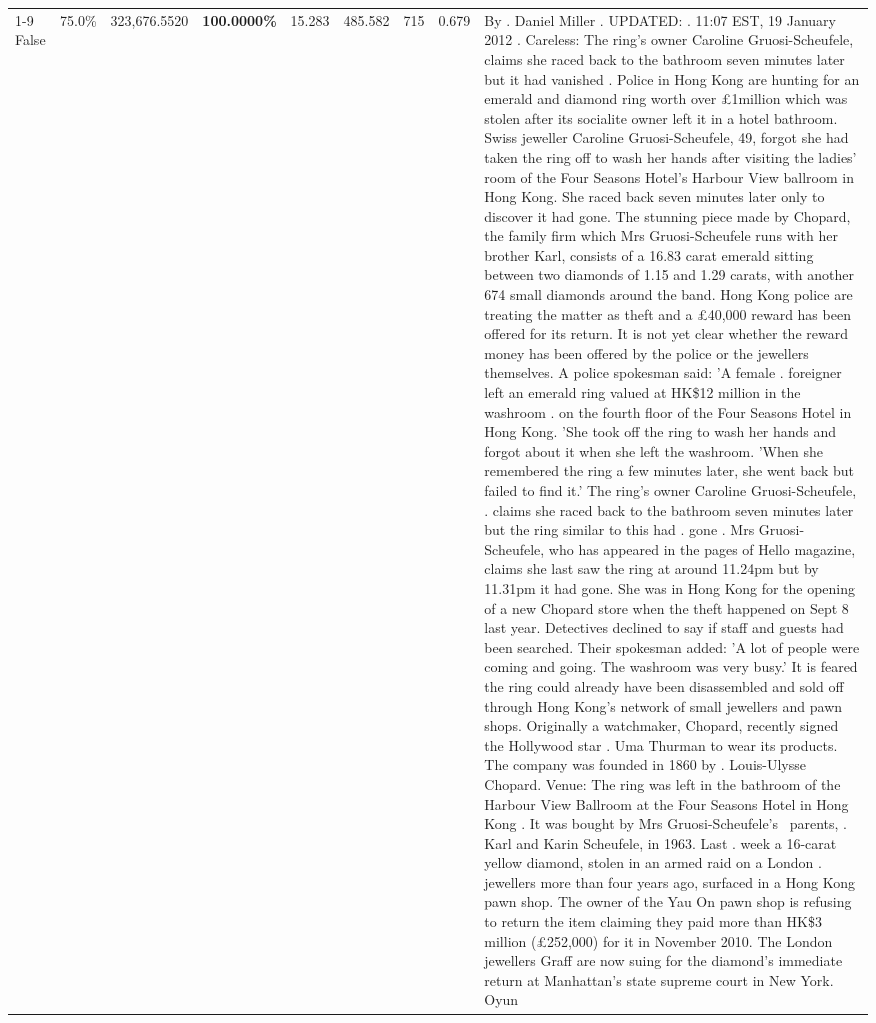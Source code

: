 \begin{table}[H]
\begin{tabular}{lllrlllll}
\cline{1-9}
False & 75.0\% & 323,676.5520 & \bfseries \color{red} 100.0000\% & 15.283 & 485.582 & 715 & 0.679 & By . Daniel Miller . UPDATED: . 11:07 EST, 19 January 2012 . Careless: The ring's owner Caroline Gruosi-Scheufele, claims she raced back to the bathroom seven minutes later but it had vanished . Police in Hong Kong are hunting for an emerald and diamond ring worth over £1million which was stolen after its socialite owner left it in a hotel bathroom. Swiss jeweller Caroline Gruosi-Scheufele, 49, forgot she had taken the ring off to wash her hands after visiting the ladies' room of the Four Seasons Hotel's Harbour View ballroom in Hong Kong. She raced back seven minutes later only to discover it had gone. The stunning piece made by Chopard, the family firm which Mrs Gruosi-Scheufele runs with her brother Karl, consists of a 16.83 carat emerald sitting between two diamonds of 1.15 and 1.29 carats, with another 674 small diamonds around the band. Hong Kong police are treating the matter as theft and a £40,000 reward has been offered for its return. It is not yet clear whether the reward money has been offered by the police or the jewellers themselves. A police spokesman said: 'A female . foreigner left an emerald ring valued at HK\$12 million in the washroom . on the fourth floor of the Four Seasons Hotel in Hong Kong. 'She took off the ring to wash her hands and forgot about it when she left the washroom. 'When she remembered the ring a few minutes later, she went back but failed to find it.' The ring's owner Caroline Gruosi-Scheufele, . claims she raced back to the bathroom seven minutes later but the ring similar to this had . gone . Mrs Gruosi-Scheufele, who has appeared in the pages of Hello magazine, claims she last saw the ring at around 11.24pm but by 11.31pm it had gone. She was in Hong Kong for the opening of a new Chopard store when the theft happened on Sept 8 last year. Detectives declined to say if staff and guests had been searched. Their spokesman added: 'A lot of people were coming and going. The washroom was very busy.' It is feared the ring could already have been disassembled and sold off through Hong Kong's network of small jewellers and pawn shops. Originally a watchmaker, Chopard, recently signed the Hollywood star . Uma Thurman to wear its products. The company was founded in 1860 by . Louis-Ulysse Chopard. Venue: The ring was left in the bathroom of the Harbour View Ballroom at the Four Seasons Hotel in Hong Kong . It was bought by Mrs Gruosi-Scheufele's  parents, . Karl and Karin Scheufele, in 1963. Last . week a 16-carat yellow diamond, stolen in an armed raid on a London . jewellers more than four years ago, surfaced in a Hong Kong pawn shop. The owner of the Yau On pawn shop is refusing to return the item claiming they paid more than HK\$3 million (£252,000) for it in November 2010. The London jewellers Graff are now suing for the diamond’s immediate return at Manhattan’s state supreme court in New York. Oyun \\

\end{tabular}
\end{table}
